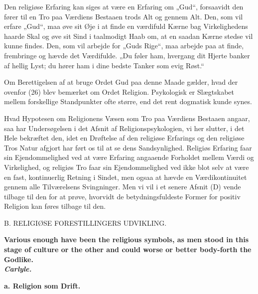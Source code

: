 \documentclass[12pt,a4paper,openany]{book}
\newcommand{\opage}[1]{\marginnote{\footnotesize\textit{[#1]}}}
\begin{document}
Den religiøse Erfaring kan siges at være en Erfaring om „Gud“,
forsaavidt den fører til en Tro paa Værdiens Bestaaen trods Alt og
gennem Alt. Den, som vil erfare „Gud“, maa øve sit Øje i at finde en
værdifuld Kærne bag Virkelighedens haarde Skal og øve sit Sind i
taalmodigt Haab om, at en saadan Kærne stedse vil kunne findes. Den, som
vil arbejde for „Guds Rige“, maa arbejde
\opage{84}paa at finde, frembringe og hævde det Værdifulde. „Du føler
ham, hvergang dit Hjerte banker af hellig Lyst; du hører ham i dine
bedste Tanker som evig Røst.“

Om Berettigelsen af at bruge Ordet Gud paa denne Maade gælder, hvad der
ovenfor (26) blev bemærket om Ordet Religion. Psykologisk er Slægtskabet
mellem forskellige Standpunkter ofte større, end det rent dogmatisk
kunde synes.

Hvad Hypotesen om Religionens Væsen som Tro paa Værdiens Bestaaen
angaar, saa har Undersøgelsen i det Afsnit af Religionspsykologien, vi
her slutter, i det Hele bekræftet den, idet en Drøftelse af den
religiøse Erfarings og den religiøse Tros Natur afgjort har ført os til
at se dens Sandsynlighed. Religiøs Erfaring faar sin Ejendommelighed ved
at være Erfaring angaaende Forholdet mellem Værdi og Virkelighed, og
religiøs Tro faar sin Ejendommelighed ved ikke blot selv at være en
fast, kontinuerlig Retning i Sindet, men ogsaa at hævde en
Værdikontinuitet gennem alle Tilværelsens Svingninger. Men vi vil i et
senere Afsnit (D) vende tilbage til den for at prøve, hvorvidt de
betydningsfuldeste Former for positiv Religion kan føres tilbage til
den.

\clearpage

\opage{85}\begin{center}B. RELIGIØSE FORESTILLINGERS UDVIKLING.\end{center}

\begin{flushright}\begin{minipage}{0.55\textwidth}\small\bfseries
Various enough have been the religious symbols, as men stood in this
stage of culture or the other and could worse or better body-forth the
Godlike.\\
\hfill\textit{Carlyle.}
\end{minipage}\end{flushright}

\begin{center}\textbf{a. Religion som Drift.}\end{center}
\end{document}
